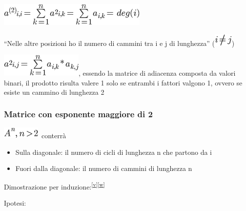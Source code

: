 \documentclass{article}
\providecommand{\tightlist}{%
  \setlength{\itemsep}{0pt}\setlength{\parskip}{0pt}}
\begin{document}
\includegraphics{images/image414.png}

{}

{``Nelle altre posizioni ho il numero di cammini tra i e j di
lunghezza'' (}\includegraphics{images/image415.png}{)}

\includegraphics{images/image416.png}{, essendo la matrice di adiacenza
composta da valori binari, il prodotto risulta valere 1 solo se entrambi
i fattori valgono 1, ovvero se esiste un cammino di lunghezza 2}

{}

\hypertarget{h.yvqsj238z2mk}{\subsubsection{\texorpdfstring{{Matrice con
esponente maggiore di
2}}{Matrice con esponente maggiore di 2}}\label{h.yvqsj238z2mk}}

\includegraphics{images/image417.png}{~conterrà}

\begin{itemize}
\tightlist
\item
  {Sulla diagonale: il numero di cicli di lunghezza n che partono da i}
\item
  {Fuori dalla diagonale: il numero di cammini di lunghezza n}
\end{itemize}

{}

{Dimostrazione per
induzione:}\textsuperscript{\protect\hyperlink{cmnt22}{{[}v{]}}\protect\hyperlink{cmnt23}{{[}w{]}}}

{Ipotesi:}
\end{document}
